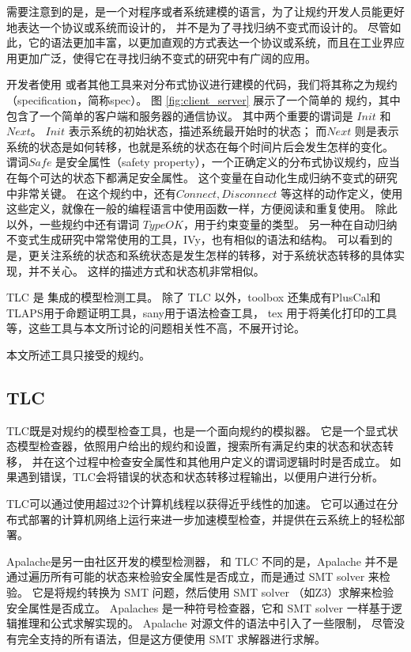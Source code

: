 需要注意到的是，\TLA 是一个对程序或者系统建模的语言，为了让规约开发人员能更好地表达一个协议或系统而设计的，
并不是为了寻找归纳不变式而设计的。
尽管如此，它的语法更加丰富，以更加直观的方式表达一个协议或系统，而且在工业界应用更加广泛，使得它在寻找归纳不变式的研究中有广阔的应用。

开发者使用 \TLA 或者其他工具来对分布式协议进行建模的代码，我们将其称之为规约（specification，简称spec）。
图 \ref{fig:client_server} 展示了一个简单的 \TLA 规约，其中包含了一个简单的客户端和服务器的通信协议。
其中两个重要的谓词是 $Init$ 和 $Next$。
$Init$ 表示系统的初始状态，描述系统最开始时的状态；
而$Next$ 则是表示系统的状态是如何转移，也就是系统的状态在每个时间片后会发生怎样的变化。
谓词$Safe$ 是安全属性（safety property），一个正确定义的分布式协议规约，应当在每个可达的状态下都满足安全属性。
这个变量在自动化生成归纳不变式的研究中非常关键。
在这个规约中，还有$Connect, Disconnect$ 等这样的动作定义，使用这些定义，就像在一般的编程语言中使用函数一样，方便阅读和重复使用。
除此以外，一些规约中还有谓词 $TypeOK$，用于约束变量的类型。
另一种在自动归纳不变式生成研究中常常使用的工具，IVy，也有相似的语法和结构。
可以看到的是，\TLA 更关注系统的状态和系统状态是发生怎样的转移，对于系统状态转移的具体实现，\TLA 并不关心。
这样的描述方式和状态机非常相似。

TLC 是 \TLA 集成的模型检测工具。
除了 TLC 以外，\TLA toolbox\cite{tla+toolbox} 还集成有PlusCal\cite{PlusCal}和TLAPS用于命题证明工具，sany用于语法检查工具，
tex 用于将\TLA 美化打印的工具等，这些工具与本文所讨论的问题相关性不高，不展开讨论。

本文所述工具只接受\TLA 的规约。

\subsection{TLC}\label{sec:tlc-apalache}
TLC既是对\TLA 规约的模型检查工具，也是一个面向规约的模拟器。
它是一个显式状态模型检查器，依照用户给出的规约和设置，搜索所有满足约束的状态和状态转移，
并在这个过程中检查安全属性和其他用户定义的谓词逻辑时时是否成立。
如果遇到错误，TLC会将错误的状态和状态转移过程输出，以便用户进行分析。

TLC可以通过使用超过32个计算机线程以获得近乎线性的加速。
它可以通过在分布式部署的计算机网络上运行来进一步加速模型检查，并提供在云系统上的轻松部署。

Apalache\cite{apalache1, apalache2}是另一由社区开发的模型检测器， 和 TLC 不同的是，Apalache 并不是通过遍历所有可能的状态来检验安全属性是否成立，而是通过 SMT solver 来检验。
它是将\TLA 规约转换为 SMT 问题，然后使用 SMT solver （如Z3\cite{z3}）求解来检验安全属性是否成立。
Apalaches 是一种符号检查器，它和 SMT solver 一样基于逻辑推理和公式求解实现的。
Apalache 对\TLA 源文件的语法中引入了一些限制，
尽管没有完全支持\TLA 的所有语法，但是这方便使用 SMT 求解器进行求解。

